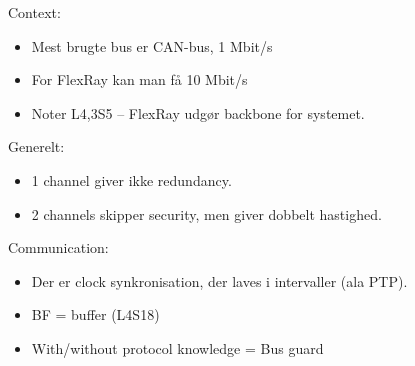 \documentclass[oneside, 10pt]{article}
\begin{document}
Context:
\begin{itemize}
	\item Mest brugte bus er CAN-bus, 1 Mbit/s
	\item For FlexRay kan man få 10 Mbit/s
	\item Noter L4,3S5 -- FlexRay udgør backbone for systemet.
\end{itemize}

Generelt:
\begin{itemize}
	\item 1 channel giver ikke redundancy.
	\item 2 channels skipper security, men giver dobbelt hastighed.
\end{itemize}

Communication:
\begin{itemize}
	\item Der er clock synkronisation, der laves i intervaller (ala PTP).

	\item BF = buffer (L4S18)
	\item With/without protocol knowledge = Bus guard
\end{itemize}
\end{document}
